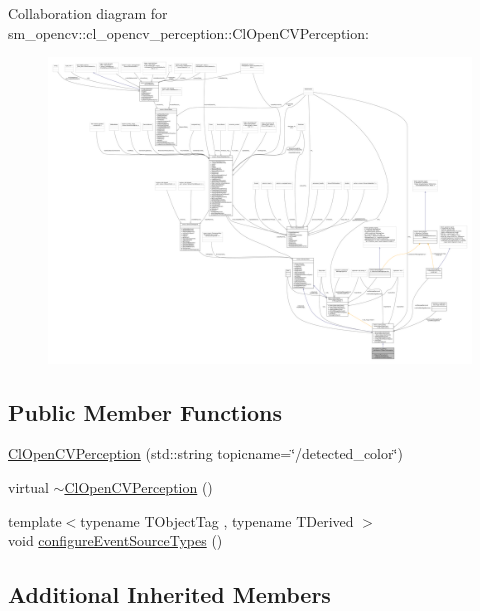 Collaboration diagram for sm\+\_\+opencv\+:\+:cl\+\_\+opencv\+\_\+perception\+:\+:Cl\+Open\+C\+V\+Perception\+:
\nopagebreak
\begin{figure}[H]
\begin{center}
\leavevmode
\includegraphics[width=350pt]{classsm__opencv_1_1cl__opencv__perception_1_1ClOpenCVPerception__coll__graph}
\end{center}
\end{figure}
\subsection*{Public Member Functions}
\begin{DoxyCompactItemize}
\item 
\hyperlink{classsm__opencv_1_1cl__opencv__perception_1_1ClOpenCVPerception_a3a2c3f081e658efd05841d4643ac2b35}{Cl\+Open\+C\+V\+Perception} (std\+::string topicname=\char`\"{}/detected\+\_\+color\char`\"{})
\item 
virtual \hyperlink{classsm__opencv_1_1cl__opencv__perception_1_1ClOpenCVPerception_a38d569dcef793679972bcaecd32b5a63}{$\sim$\+Cl\+Open\+C\+V\+Perception} ()
\item 
{\footnotesize template$<$typename T\+Object\+Tag , typename T\+Derived $>$ }\\void \hyperlink{classsm__opencv_1_1cl__opencv__perception_1_1ClOpenCVPerception_ae518d17771e363f959b29d44f8f76a13}{configure\+Event\+Source\+Types} ()
\end{DoxyCompactItemize}
\subsection*{Additional Inherited Members}


